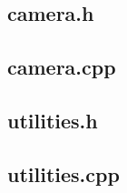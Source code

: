 \documentclass[10pt,a4paper]{article}
\begin{document}
\subsection{camera.h}

\subsection{camera.cpp}

\clearpage
\subsection{utilities.h}

\subsection{utilities.cpp}

\end{document}

